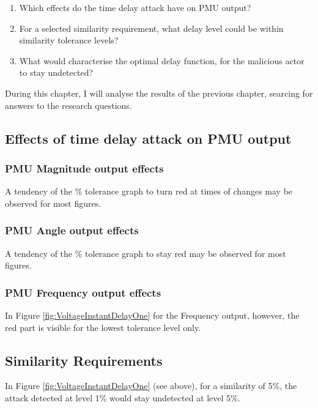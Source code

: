 \begin{enumerate}
    \item Which effects do the time delay attack have on PMU output?
    \item For a selected similarity requirement, what delay level could be within similarity tolerance levels?
    \item What would characterise the optimal delay function, for the malicious actor to stay undetected?    
\end{enumerate}

During this chapter, I will analyse the results of the previous chapter, searcing for answers to the research questions.

\subsection{Effects of time delay attack on PMU output}

\subsubsection{PMU Magnitude output effects}
A tendency of the \% tolerance graph to turn red at times of changes may be observed for most figures.

\subsubsection{PMU Angle output effects}

A tendency of the \% tolerance graph to stay red may be observed for most figures.


\subsubsection{PMU Frequency output effects}
In Figure \ref{fig:VoltageInstantDelayOne} for the Frequency output, however, the red part is visible for the lowest tolerance level only.
\subsection{Similarity Requirements}
In Figure \ref{fig:VoltageInstantDelayOne} (see above), for a similarity of 5\%, the attack detected  at level 1\% would stay undetected at level 5\%. 